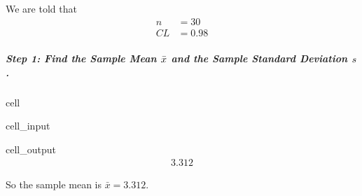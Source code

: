 \documentclass[letterpaper,10pt,english]{jupyterBook}
\begin{document}
\sphinxAtStartPar
We are told that
\begin{align*}
n &= 30 \\
CL &= 0.98
\end{align*}

\subparagraph{Step 1: Find the Sample Mean \protect\(\bar{x}\protect\) and the Sample Standard Deviation \protect\(s\protect\).}
\label{\detokenize{Ch5 Confidence Intervals/5.4 Estimating Population Means (Sigma Unknown):id2}}
\begin{sphinxuseclass}{cell}\begin{sphinxVerbatimInput}

\begin{sphinxuseclass}{cell_input}
\begin{sphinxVerbatim}[commandchars=\\\{\}]

\end{sphinxVerbatim}

\end{sphinxuseclass}\end{sphinxVerbatimInput}
\begin{sphinxVerbatimOutput}

\begin{sphinxuseclass}{cell_output}\begin{equation*}
\begin{split}3.312\end{split}
\end{equation*}
\end{sphinxuseclass}\end{sphinxVerbatimOutput}

\end{sphinxuseclass}
\sphinxAtStartPar
So the sample mean is \(\bar{x} = 3.312\).
\end{document}

